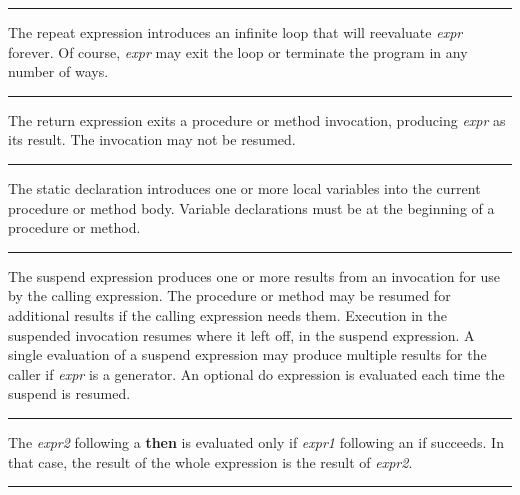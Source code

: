 \bigskip\hrule\vspace{0.1cm}

\noindent
{}The \textsf{repeat} expression
introduces an infinite loop that will reevaluate \textit{expr} forever.
Of course, \textit{expr} may exit the loop or terminate the program in
any number of ways.

\bigskip\hrule\vspace{0.1cm}

\noindent
{}The \textsf{return} expression exits a procedure or method
invocation, producing \textit{expr} as its result. The invocation may
not be resumed.

\bigskip\hrule\vspace{0.1cm}

\noindent
{}The \textsf{static} declaration introduces one or more
local variables into the current procedure or method body. Variable
declarations must be at the beginning of a procedure or method.

\bigskip\hrule\vspace{0.1cm}

\noindent
{}The \textsf{suspend} expression produces one or more
results from an invocation for use by the calling expression. The
procedure or method may be resumed for additional results if the
calling expression needs them. Execution in the suspended invocation
resumes where it left off, in the \textsf{suspend} expression. A single
evaluation of a \textsf{suspend} expression may produce multiple
results for the caller if \textit{expr} is a
generator. An optional \textsf{do} expression is
evaluated each time the \textsf{suspend} is resumed.

\bigskip\hrule\vspace{0.1cm}

\noindent
{}The \textit{expr2} following a \textsf{\bf then} is evaluated
only if \textit{expr1} following an \textsf{if} succeeds. In that case,
the result of the whole expression is the result of \textit{expr2}.


\bigskip\hrule\vspace{0.1cm}

